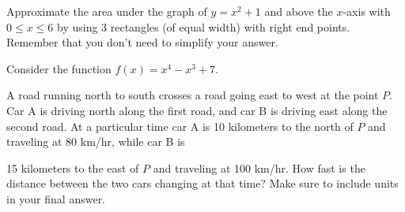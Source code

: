 \documentclass[addpoints,12pt]{exam}
\begin{document}
\begin{questions}




\newpage

\newpage

\question[6] Approximate the area under the graph of $y = x^2+ 1$ and above the $x$-axis with
$0 \le x\le 6$ by using 3 rectangles (of equal width) with right end points. Remember that you
don't need to simplify your answer.

\newpage

\question Consider the function $f(x)=x^4-x^3+7$.





\newpage

\question[10] A road running north to south crosses a road going east to west at the point $P.$
Car A is driving north along the first road, and car B is driving east along the second road. At a
particular time car A is 10 kilometers to the north of $P$ and traveling at 80 km/hr, while car B is

15 kilometers to the east of $P$ and traveling at 100 km/hr. How fast is the distance between
the two cars changing at that time? Make sure to include units in your final answer.


\end{questions}
\end{document}
